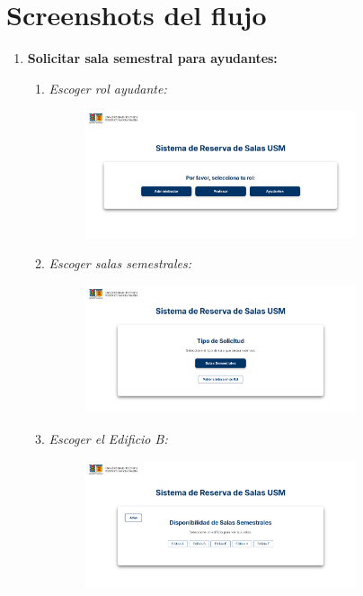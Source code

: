 \documentclass{article}
\begin{document}
    \section{Screenshots del flujo}
        \begin{enumerate}
        \item \textbf{Solicitar sala semestral para ayudantes:}
        \begin{enumerate}
            \item \textit{Escoger rol ayudante:}
            \begin{figure}[H] 
                \centering 
                \includegraphics[width=0.8\textwidth]{IMG/ss1.png}
            \end{figure}

            \newpage
            \item \textit{Escoger salas semestrales:}
            \begin{figure}[H] 
                \centering 
                \includegraphics[width=0.8\textwidth]{IMG/ss2.png} 
            \end{figure}

            \item \textit{Escoger el Edificio B:}
            \begin{figure}[H] 
                \centering 
                \includegraphics[width=0.8\textwidth]{IMG/ss3.png} 
            \end{figure}


\end{enumerate}
\end{enumerate}
\end{document}
